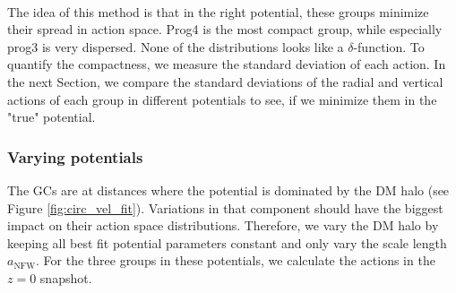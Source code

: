 \\The idea of this method is that in the right potential, these groups minimize their spread in action space. Prog4 is the most compact group, while especially prog3 is very dispersed. None of the distributions looks like a $\delta$-function. To quantify the compactness, we measure the standard deviation of each action. In the next Section, we compare the standard deviations of the radial and vertical actions of each group in different potentials to see, if we minimize them in the "true" potential.

\subsubsection{Varying potentials}\label{subsubsec:GCs_actions_varying_pot}
The \acp{GC} are at distances where the potential is dominated by the \ac{DM} halo (see Figure \ref{fig:circ_vel_fit}). Variations in that component should have the biggest impact on their action space distributions. Therefore, we vary the \ac{DM} halo by keeping all best fit potential parameters constant and only vary the scale length $a_\mathrm{NFW}$. For the three groups in these potentials, we calculate the actions in the $z=0$ snapshot.

